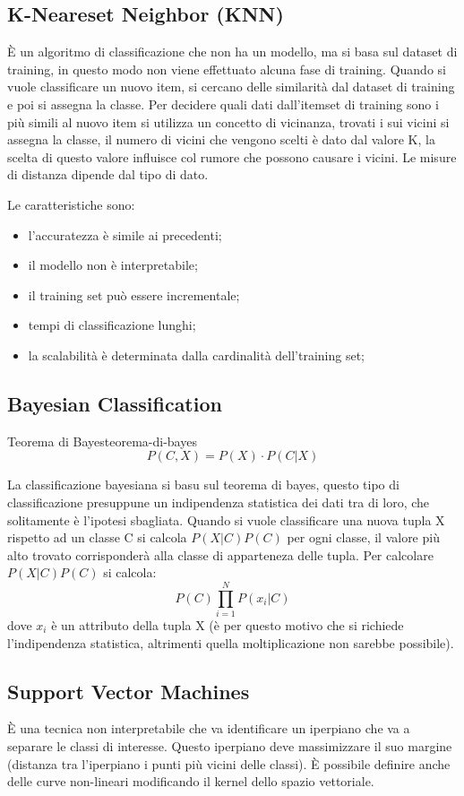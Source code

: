 \documentclass[12pt]{article}
\begin{document}
\subsection{K-Neareset Neighbor (KNN)}
\`E un algoritmo di classificazione che non ha un modello, ma si basa sul dataset di training, in questo modo non viene effettuato alcuna fase di training. Quando si vuole classificare un nuovo item, si cercano delle similarit\`a dal dataset di training e poi si assegna la classe. Per decidere quali dati dall'itemset di training sono i pi\`u simili al nuovo item si utilizza un concetto di vicinanza, trovati i sui vicini si assegna la classe, il numero di vicini che vengono scelti \`e dato dal valore K, la scelta di questo valore influisce col rumore che possono causare i vicini. Le misure di distanza dipende dal tipo di dato.

Le caratteristiche sono:
\begin{itemize}
    \item l'accuratezza \`e simile ai precedenti;
    \item il modello non \`e interpretabile;
    \item il training set pu\`o essere incrementale;
    \item tempi di classificazione lunghi;
    \item la scalabilit\`a \`e determinata dalla cardinalit\`a dell'training set;
\end{itemize}


\subsection{Bayesian Classification}
\begin{theorem}{Teorema di Bayes}{teorema-di-bayes}
    \[ P(C,X) = P(X) \cdot P(C|X) \]
\end{theorem}
La classificazione bayesiana si basu sul teorema di bayes, questo tipo di classificazione presuppune un indipendenza statistica dei dati tra di loro, che solitamente \`e l'ipotesi sbagliata. Quando si vuole classificare una nuova tupla X rispetto ad un classe C si calcola $P(X|C)P(C)$ per ogni classe, il valore pi\`u alto trovato corrisponder\`a alla classe di apparteneza delle tupla. Per calcolare $P(X|C)P(C)$ si calcola:
\[ P(C) \prod_{i=1}^{N} P(x_i|C)  \]
dove $x_i$ \`e un attributo della tupla X (\`e per questo motivo che si richiede l'indipendenza statistica, altrimenti quella moltiplicazione non sarebbe possibile).


\subsection{Support Vector Machines}
\`E una tecnica non interpretabile che va identificare un iperpiano che va a separare le classi di interesse. Questo iperpiano deve massimizzare il suo margine (distanza tra l'iperpiano i punti pi\`u vicini delle classi). \`E possibile definire anche delle curve non-lineari modificando il kernel dello spazio vettoriale.
\end{document}
